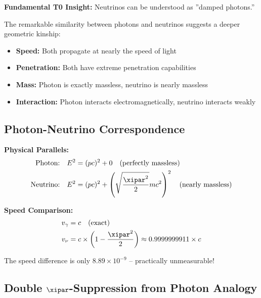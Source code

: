 	\begin{speculation}
		\textbf{Fundamental T0 Insight:} Neutrinos can be understood as ''damped photons.''
		
		The remarkable similarity between photons and neutrinos suggests a deeper geometric kinship:
		\begin{itemize}
			\item \textbf{Speed:} Both propagate at nearly the speed of light
			\item \textbf{Penetration:} Both have extreme penetration capabilities
			\item \textbf{Mass:} Photon is exactly massless, neutrino is nearly massless
			\item \textbf{Interaction:} Photon interacts electromagnetically, neutrino interacts weakly
		\end{itemize}
	\end{speculation}
	
	\subsection{Photon-Neutrino Correspondence}
	
	\begin{important}
		\textbf{Physical Parallels:}
		\begin{align}
			\text{Photon:} \quad &E^2 = (pc)^2 + 0 \quad \text{(perfectly massless)} \\
			\text{Neutrino:} \quad &E^2 = (pc)^2 + \left(\sqrt{\frac{\xipar^2}{2}} m c^2\right)^2 \quad \text{(nearly massless)}
		\end{align}
		
		\textbf{Speed Comparison:}
		\begin{align}
			v_\gamma &= c \quad \text{(exact)} \\
			v_\nu &= c \times \left(1 - \frac{\xipar^2}{2}\right) \approx 0.9999999911 \times c
		\end{align}
		
		The speed difference is only \(8.89 \times 10^{-9}\) -- practically unmeasurable!
	\end{important}
	
	\subsection{Double \(\xipar\)-Suppression from Photon Analogy}
	
